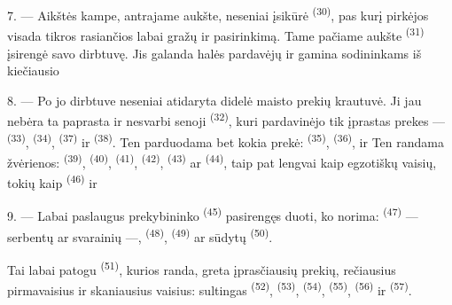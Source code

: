 7. --- Aikštės kampe, antrajame aukšte, neseniai įsikūrė  \textsuperscript{(30)}, pas kurį pirkėjos visada tikros rasiančios labai
gražų  ir  pasirinkimą.
Tame pačiame aukšte  \textsuperscript{(31)} įsirengė savo dirbtuvę.
Jis galanda halės pardavėjų  ir gamina sodininkams 
iš kiečiausio 

\VUsaut{4.0mm}
\VUsaut{3.0mm}

8. --- Po jo dirbtuve neseniai atidaryta didelė maisto prekių krautuvė. Ji jau
nebėra ta paprasta ir nesvarbi senoji 
\textsuperscript{(32)}, kuri pardavinėjo tik įprastas prekes --- 
\textsuperscript{(33)},  \textsuperscript{(34)},  \textsuperscript{(37)} ir  \textsuperscript{(38)}. Ten parduodama
bet kokia prekė:  
\textsuperscript{(35)},  \textsuperscript{(36)}, 
 ir  Ten randama
žvėrienos:  \textsuperscript{(39)}, 
\textsuperscript{(40)},  \textsuperscript{(41)}, 
\textsuperscript{(42)},  \textsuperscript{(43)} ar
 \textsuperscript{(44)}, taip pat lengvai kaip egzotiškų vaisių, tokių
kaip  \textsuperscript{(46)} ir 

9. --- Labai paslaugus prekybininko  \textsuperscript{(45)}
pasirengęs duoti, ko norima:  \textsuperscript{(47)} --- serbentų ar
svarainių ---,  \textsuperscript{(48)}, 
\textsuperscript{(49)} ar sūdytų  \textsuperscript{(50)}.

Tai labai patogu  \textsuperscript{(51)}, kurios randa, greta
įprasčiausių prekių, rečiausius pirmavaisius ir skaniausius vaisius: sultingas
 \textsuperscript{(52)},  \textsuperscript{(53)},
 \textsuperscript{(54)},  \textsuperscript{(55)},
 \textsuperscript{(56)} ir  \textsuperscript{(57)}.

\VUsaut{4.0mm}
\VUsaut{3.0mm}

